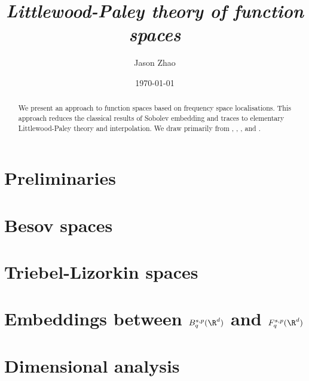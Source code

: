 \documentclass[reqno]{amsart}
\title
{
	\emph{Littlewood-Paley theory of function spaces}
}
\author{Jason Zhao}
\date{\today}
\theoremstyle{definition}
\theoremstyle{remark}
\begin{document}
\maketitle

\begin{abstract}
	We present an approach to function spaces based on frequency space localisations. This approach reduces the classical results of Sobolev embedding and traces to elementary Littlewood-Paley theory and interpolation. We draw primarily from \cite{Triebel1983}, \cite{BahouriEtAl2011}, \cite{WangEtAl2011}, and \cite{Grafakos2014a}. 
\end{abstract}

\tableofcontents

\section{Preliminaries}


\section{Besov spaces}


\section{Triebel-Lizorkin spaces}


\section{Embeddings between $B^{s, p}_q (\R^d)$ and $F^{s, p}_q (\R^d)$}


\section{Dimensional analysis}






\end{document}
